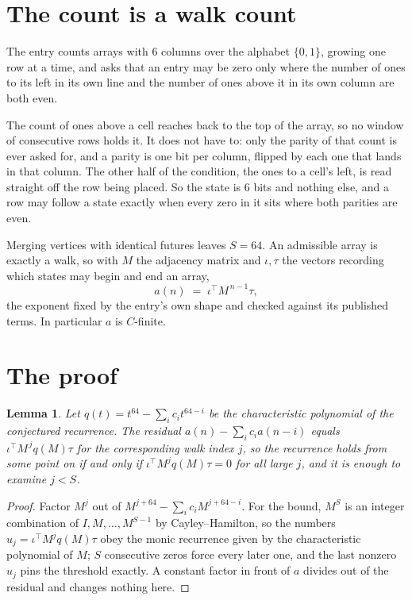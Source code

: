 \documentclass[11pt,a4paper]{article}
\theoremstyle{plain}
\newtheorem{lemma}[theorem]{Lemma}
\theoremstyle{definition}
\begin{document}
\section{The count is a walk count}

The entry counts arrays with $6$ columns over the alphabet $\{0,1\}$, growing one row at a time, and asks that an entry may be zero only where the number of ones to its left in its own line and the number of ones above it in its own column are both even.

The count of ones above a cell reaches back to the top of the array, so no window of consecutive rows holds it. It does not have to: only the parity of that count is ever asked for, and a parity is one bit per column, flipped by each one that lands in that column. The other half of the condition, the ones to a cell's left, is read straight off the row being placed. So the state is $6$ bits and nothing else, and a row may follow a state exactly when every zero in it sits where both parities are even.

Merging vertices with identical futures leaves $S=64$. An admissible array is exactly a walk, so with $M$ the adjacency matrix and $\iota,\tau$ the vectors recording which states may begin and end an array,
\[
a(n)\;=\;\iota^{\!\top}M^{\,n-1}\tau ,
\]
the exponent fixed by the entry's own shape and checked against its published terms. In
particular $a$ is $C$-finite.

\section{The proof}

\begin{lemma}\label{lem:crit}
Let $q(t)=t^{64}-\sum_i c_it^{64-i}$ be the characteristic polynomial of the
conjectured recurrence. The residual $a(n)-\sum_ic_ia(n-i)$ equals
$\iota^{\!\top}M^{\,j}q(M)\tau$ for the corresponding walk index $j$, so the recurrence
holds from some point on if and only if $\iota^{\!\top}M^{j}q(M)\tau=0$ for all large $j$,
and it is enough to examine $j<S$.
\end{lemma}

\begin{proof}
Factor $M^{j}$ out of $M^{j+64}-\sum_ic_iM^{j+64-i}$. For the bound, $M^{S}$
is an integer combination of $I,M,\dots,M^{S-1}$ by Cayley--Hamilton, so the numbers
$u_j=\iota^{\!\top}M^{j}q(M)\tau$ obey the monic recurrence given by the characteristic
polynomial of $M$; $S$ consecutive zeros force every later one, and the last nonzero $u_j$
pins the threshold exactly. A constant factor in front of $a$ divides out of the residual and
changes nothing here.
\end{proof}
\end{document}
